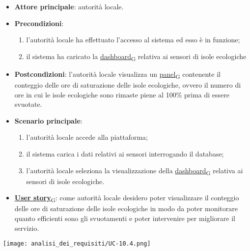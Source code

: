 \newpage

\begin{itemize}
	\item \textbf{Attore principale}: autorità locale.
	\item \textbf{Precondizioni}:
	      \begin{enumerate}
		      \item l'autorità locale ha effettuato l'accesso al sistema ed esso è in funzione;
		      \item il sistema ha caricato la \href{https://7last.github.io/docs/rtb/documentazione-interna/glossario\#dashboard}{dashboard\textsubscript{G}} relativa ai sensori di isole ecologiche
	      \end{enumerate}
	\item \textbf{Postcondizioni}: l'autorità locale visualizza un \href{https://7last.github.io/docs/rtb/documentazione-interna/glossario\#panel}{panel\textsubscript{G}} contenente il conteggio delle ore di saturazione delle isole ecologiche,
	      ovvero il numero di ore in cui le isole ecologiche sono rimaste piene al 100\% prima di essere svuotate.
	\item \textbf{Scenario principale}:
	      \begin{enumerate}
		      \item l'autorità locale accede alla piattaforma;
		      \item il sistema carica i dati relativi ai sensori interrogando il database;
		      \item l'autorità locale seleziona la visualizzazione della \href{https://7last.github.io/docs/rtb/documentazione-interna/glossario\#dashboard}{dashboard\textsubscript{G}} relativa ai sensori di isole ecologiche.
	      \end{enumerate}
	\item \href{https://7last.github.io/docs/rtb/documentazione-interna/glossario\#user-story}{\textbf{User story}\textsubscript{G}}:
	      come autorità locale desidero poter visualizzare il conteggio delle ore di saturazione delle isole ecologiche in modo da poter monitorare
	      quanto efficienti sono gli svuotamenti e poter intervenire per migliorare il servizio.
\end{itemize}
\begin{center}
	\texttt{[image: analisi\_dei\_requisiti/UC-10.4.png]}
\end{center}

